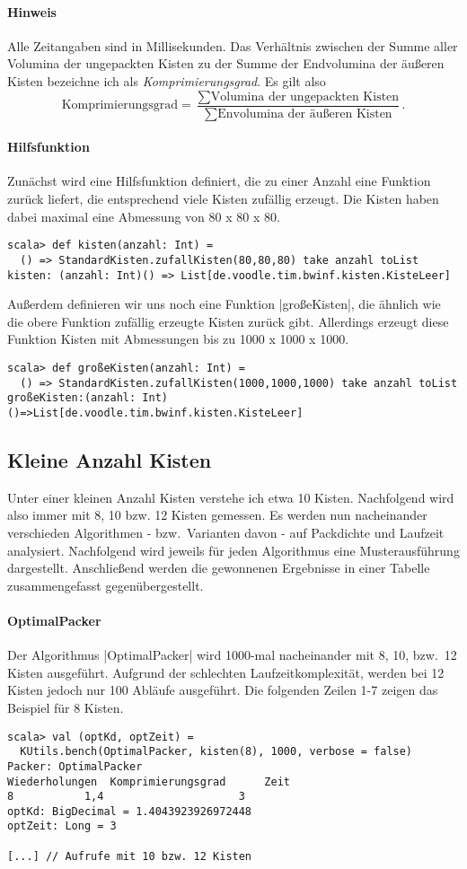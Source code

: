 \paragraph{Hinweis}
 Alle Zeitangaben sind in Millisekunden.
 Das Verhältnis zwischen der Summe aller Volumina der ungepackten Kisten zu der Summe der Endvolumina der äußeren Kisten bezeichne ich als \emph{Komprimierungsgrad}.
 Es gilt also
 \[ \text{Komprimierungsgrad} = \dfrac{\sum\text{Volumina der ungepackten Kisten}}{\sum\text{Envolumina der äußeren Kisten}} .\]
\paragraph{Hilfsfunktion}
 Zunächst wird eine Hilfsfunktion definiert, die zu einer Anzahl eine Funktion zurück liefert, die entsprechend viele Kisten zufällig erzeugt.
 Die Kisten haben dabei maximal eine Abmessung von 80 x 80 x 80.
\begin{lstlisting}
scala> def kisten(anzahl: Int) =
  () => StandardKisten.zufallKisten(80,80,80) take anzahl toList
kisten: (anzahl: Int)() => List[de.voodle.tim.bwinf.kisten.KisteLeer]
\end{lstlisting}
 Außerdem definieren wir uns noch eine Funktion |großeKisten|, die ähnlich wie die obere Funktion zufällig erzeugte Kisten zurück gibt.
 Allerdings erzeugt diese Funktion Kisten mit Abmessungen bis zu 1000 x 1000 x 1000.
\begin{lstlisting}
scala> def großeKisten(anzahl: Int) =
  () => StandardKisten.zufallKisten(1000,1000,1000) take anzahl toList
großeKisten:(anzahl: Int)()=>List[de.voodle.tim.bwinf.kisten.KisteLeer]
\end{lstlisting}

\clearpage
\subsection{Kleine Anzahl Kisten}
\label{optAlg}
 Unter einer kleinen Anzahl Kisten verstehe ich etwa 10 Kisten. Nachfolgend wird also immer mit 8, 10 bzw. 12 Kisten gemessen.
 Es werden nun nacheinander verschieden Algorithmen - bzw.\ Varianten davon - auf Packdichte und Laufzeit analysiert.
 Nachfolgend wird jeweils für jeden Algorithmus eine Musterausführung dargestellt.
 Anschließend werden die gewonnenen Ergebnisse in einer Tabelle zusammengefasst gegenübergestellt.
\paragraph{OptimalPacker}
 Der Algorithmus |OptimalPacker| wird 1000-mal nacheinander mit 8, 10, bzw.\ 12 Kisten ausgeführt.
 Aufgrund der schlechten Laufzeitkomplexität, werden bei 12 Kisten jedoch nur 100 Abläufe ausgeführt.
 Die folgenden Zeilen 1-7 zeigen das Beispiel für 8 Kisten.
\begin{lstlisting}
scala> val (optKd, optZeit) =
  KUtils.bench(OptimalPacker, kisten(8), 1000, verbose = false)
Packer: OptimalPacker
Wiederholungen  Komprimierungsgrad      Zeit
8       	1,4                     3
optKd: BigDecimal = 1.4043923926972448
optZeit: Long = 3

[...] // Aufrufe mit 10 bzw. 12 Kisten
\end{lstlisting}

